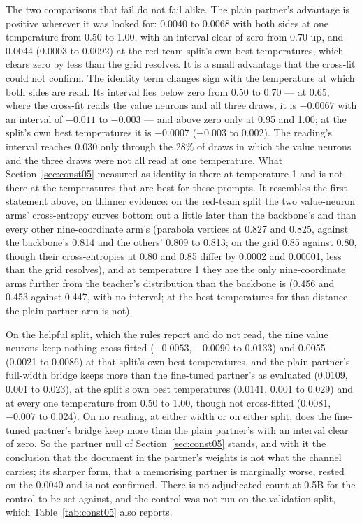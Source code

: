 \documentclass[11pt]{article}
\begin{document}
The two comparisons that fail do not fail alike. The plain partner's advantage is
positive wherever it was looked for: 0.0040 to 0.0068 with both sides at one
temperature from 0.50 to 1.00, with an interval clear of zero from 0.70 up, and
0.0044 (0.0003 to 0.0092) at the red-team split's own best temperatures, which
clears zero by less than the grid resolves. It is a small advantage that the
cross-fit could not confirm. The identity term changes sign with the temperature
at which both sides are read. Its interval lies below zero from 0.50 to 0.70 ---
at 0.65, where the cross-fit reads the value neurons and all three draws, it is
$-0.0067$ with an interval of $-0.011$ to $-0.003$ --- and above zero only at
0.95 and 1.00; at the split's own best temperatures it is $-0.0007$ ($-0.003$ to
0.002). The reading's interval reaches 0.030 only through the 28\% of draws in
which the value neurons and the three draws were not all read at one temperature.
What
Section~\ref{sec:const05} measured as identity is there at temperature 1 and is
not there at the temperatures that are best for these prompts. It resembles the
first statement above, on thinner evidence: on the red-team split the two
value-neuron arms' cross-entropy curves bottom out a little later than the
backbone's and than every other nine-coordinate arm's (parabola vertices at 0.827
and 0.825, against the backbone's 0.814 and the others' 0.809 to 0.813; on the
grid 0.85 against 0.80, though their cross-entropies at 0.80 and 0.85 differ by
0.0002 and 0.00001, less than the grid resolves), and at temperature 1 they are
the only nine-coordinate arms further from the teacher's distribution than the
backbone is (0.456 and 0.453 against 0.447, with no interval; at the best
temperatures for that distance the plain-partner arm is not).

On the helpful split, which the rules report and do not read, the nine value
neurons keep nothing cross-fitted ($-0.0053$, $-0.0090$ to 0.0133) and 0.0055
(0.0021 to 0.0086) at that split's own best temperatures, and the plain partner's
full-width bridge keeps more than the fine-tuned partner's as evaluated (0.0109,
0.001 to 0.023), at the split's own best temperatures (0.0141, 0.001 to 0.029)
and at every one temperature from 0.50 to 1.00, though not cross-fitted (0.0081,
$-0.007$ to 0.024). On no reading, at either width or on either split, does the
fine-tuned partner's bridge keep more than the plain partner's with an interval
clear of zero. So the partner null of Section~\ref{sec:const05} stands, and with
it the conclusion that the document in the partner's weights is not what the
channel carries; its sharper form, that a memorising partner is marginally worse,
rested on the 0.0040 and is not confirmed. There is no adjudicated count at 0.5B
for the control to be set against, and the control was not run on the validation
split, which Table~\ref{tab:const05} also reports.
\end{document}
